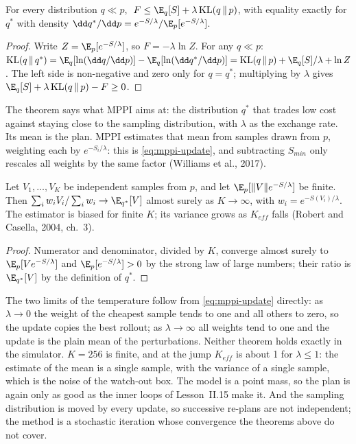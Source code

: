 \begin{theorem}
\label{thm:mppi-gibbs}
For every distribution $q \ll p$, $\;F \le \E_q[S] + \lambda\,\mathrm{KL}(q\,\|\,p)$, with equality exactly for $q^*$ with density $\dd q^*/\dd p = e^{-S/\lambda}/\E_p[e^{-S/\lambda}]$.
\end{theorem}
\begin{proof}
Write $Z = \E_p[e^{-S/\lambda}]$, so $F = -\lambda\ln Z$. For any $q \ll p$: $\mathrm{KL}(q\,\|\,q^*) = \E_q[\ln(\dd q/\dd p)] - \E_q[\ln(\dd q^*/\dd p)] = \mathrm{KL}(q\,\|\,p) + \E_q[S]/\lambda + \ln Z$. The left side is non-negative and zero only for $q = q^*$; multiplying by $\lambda$ gives $\E_q[S] + \lambda\,\mathrm{KL}(q\,\|\,p) - F \ge 0$.
\end{proof}

The theorem says what MPPI aims at: the distribution $q^*$ that trades low cost against staying close to the sampling distribution, with $\lambda$ as the exchange rate. Its mean is the plan. MPPI estimates that mean from samples drawn from $p$, weighting each by $e^{-S_i/\lambda}$: this is \cref{eq:mppi-update}, and subtracting $S_{min}$ only rescales all weights by the same factor (Williams et al., 2017).

\begin{theorem}
\label{thm:mppi-is}
Let $V_1, \dots, V_K$ be independent samples from $p$, and let $\E_p[\|V\|e^{-S/\lambda}]$ be finite. Then $\sum_i w_iV_i/\sum_i w_i \to \E_{q^*}[V]$ almost surely as $K \to \infty$, with $w_i = e^{-S(V_i)/\lambda}$. The estimator is biased for finite $K$; its variance grows as $K_{eff}$ falls (Robert and Casella, 2004, ch.~3).
\end{theorem}
\begin{proof}
Numerator and denominator, divided by $K$, converge almost surely to $\E_p[Ve^{-S/\lambda}]$ and $\E_p[e^{-S/\lambda}] > 0$ by the strong law of large numbers; their ratio is $\E_{q^*}[V]$ by the definition of $q^*$.
\end{proof}

The two limits of the temperature follow from \cref{eq:mppi-update} directly: as $\lambda \to 0$ the weight of the cheapest sample tends to one and all others to zero, so the update copies the best rollout; as $\lambda \to \infty$ all weights tend to one and the update is the plain mean of the perturbations. Neither theorem holds exactly in the simulator. $K = 256$ is finite, and at the jump $K_{eff}$ is about 1 for $\lambda \le 1$: the estimate of the mean is a single sample, with the variance of a single sample, which is the noise of the watch-out box. The model is a point mass, so the plan is again only as good as the inner loops of Lesson~II.15 make it. And the sampling distribution is moved by every update, so successive re-plans are not independent; the method is a stochastic iteration whose convergence the theorems above do not cover.

